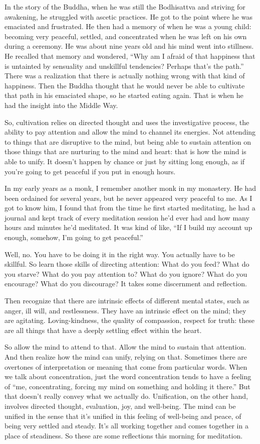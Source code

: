 In the story of the Buddha, when he was still the Bodhisattva and
striving for awakening, he struggled with ascetic practices. He got to
the point where he was emaciated and frustrated. He then had a memory of
when he was a young child: becoming very peaceful, settled, and
concentrated when he was left on his own during a ceremony. He was about
nine years old and his mind went into stillness. He recalled that memory
and wondered, “Why am I afraid of that happiness that is untainted by
sensuality and unskillful tendencies? Perhaps that’s the path.” There
was a realization that there is actually nothing wrong with that kind of
happiness. Then the Buddha thought that he would never be able to
cultivate that path in his emaciated shape, so he started eating again.
That is when he had the insight into the Middle Way.

So, cultivation relies on directed thought and uses the investigative
process, the ability to pay attention and allow the mind to channel its
energies. Not attending to things that are disruptive to the mind, but
being able to sustain attention on those things that are nurturing to
the mind and heart: that is how the mind is able to unify. It doesn’t
happen by chance or just by sitting long enough, as if you’re going to
get peaceful if you put in enough hours.

In my early years as a monk, I remember another monk in my monastery. He
had been ordained for several years, but he never appeared very peaceful
to me. As I got to know him, I found that from the time he first started
meditating, he had a journal and kept track of every meditation session
he’d ever had and how many hours and minutes he’d meditated. It was kind
of like, “If I build my account up enough, somehow, I’m going to get
peaceful.”

Well, no. You have to be doing it in the right way. You actually have to
be skillful. So learn those skills of directing attention: What do you
feed? What do you starve? What do you pay attention to? What do you
ignore? What do you encourage? What do you discourage? It takes some
discernment and reflection.

Then recognize that there are intrinsic effects of different mental
states, such as anger, ill will, and restlessness. They have an
intrinsic effect on the mind; they are agitating. Loving-kindness, the
quality of compassion, respect for truth: these are all things that have
a deeply settling effect within the heart.

So allow the mind to attend to that. Allow the mind to sustain that
attention. And then realize how the mind can unify, relying on that.
Sometimes there are overtones of interpretation or meaning that come
from particular words. When we talk about concentration, just the word
concentration tends to have a feeling of “me, concentrating, forcing my
mind on something and holding it there.” But that doesn’t really convey
what we actually do. Unification, on the other hand, involves directed
thought, evaluation, joy, and well-being. The mind can be unified in the
sense that it’s unified in this feeling of well-being and peace, of
being very settled and steady. It’s all working together and comes
together in a place of steadiness. So these are some reflections this
morning for meditation.
